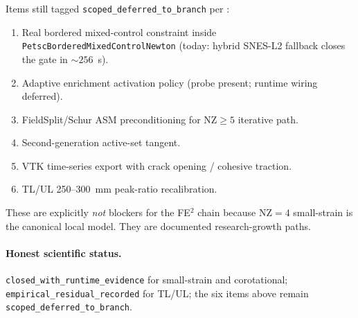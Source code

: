 Items still tagged \texttt{scoped\_deferred\_to\_branch} per
:
\begin{enumerate}
  \item Real bordered mixed-control constraint inside
        \texttt{PetscBorderedMixedControlNewton} (today: hybrid SNES-L2
        fallback closes the gate in \(\sim 256\)~s).
  \item Adaptive enrichment activation policy (probe present; runtime
        wiring deferred).
  \item FieldSplit/Schur ASM preconditioning for
        \(\mathrm{NZ}\geq 5\) iterative path.
  \item Second-generation active-set tangent.
  \item VTK time-series export with crack opening / cohesive traction.
  \item TL/UL 250--300~mm peak-ratio recalibration.
\end{enumerate}

These are explicitly \emph{not} blockers for the FE\(^2\) chain because
\(\mathrm{NZ}=4\) small-strain is the canonical local model. They are
documented research-growth paths.

\paragraph{Honest scientific status.} \texttt{closed\_with\_runtime\_evidence}
for small-strain and corotational; \texttt{empirical\_residual\_recorded}
for TL/UL; the six items above remain
\texttt{scoped\_deferred\_to\_branch}.
